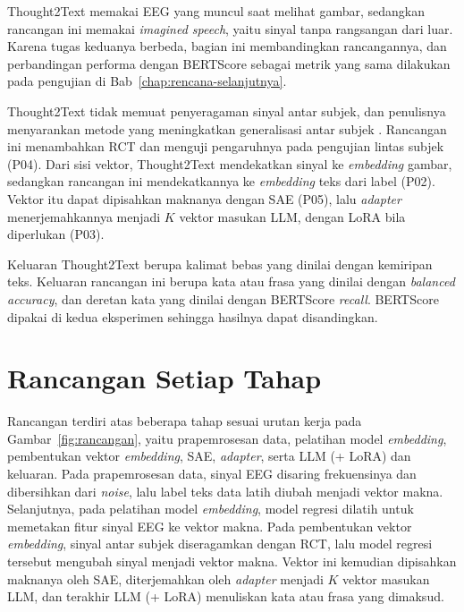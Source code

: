 Thought2Text memakai EEG yang muncul saat melihat gambar, sedangkan rancangan ini memakai \textit{imagined speech}, yaitu sinyal tanpa rangsangan dari luar.
Karena tugas keduanya berbeda, bagian ini membandingkan rancangannya, dan perbandingan performa dengan BERTScore sebagai metrik yang sama dilakukan pada pengujian di Bab~\ref{chap:rencana-selanjutnya}.

Thought2Text tidak memuat penyeragaman sinyal antar subjek, dan penulisnya menyarankan metode yang meningkatkan generalisasi antar subjek \parencite{mishra2025}.
Rancangan ini menambahkan RCT dan menguji pengaruhnya pada pengujian lintas subjek (P04).
Dari sisi vektor, Thought2Text mendekatkan sinyal ke \textit{embedding} gambar, sedangkan rancangan ini mendekatkannya ke \textit{embedding} teks dari label (P02).
Vektor itu dapat dipisahkan maknanya dengan SAE (P05), lalu \textit{adapter} menerjemahkannya menjadi $K$ vektor masukan LLM, dengan LoRA bila diperlukan (P03).

Keluaran Thought2Text berupa kalimat bebas yang dinilai dengan kemiripan teks.
Keluaran rancangan ini berupa kata atau frasa yang dinilai dengan \textit{balanced accuracy}, dan deretan kata yang dinilai dengan BERTScore \textit{recall}.
BERTScore dipakai di kedua eksperimen sehingga hasilnya dapat disandingkan.

\section{Rancangan Setiap Tahap}
\label{sec:rancangan-tahap}
Rancangan terdiri atas beberapa tahap sesuai urutan kerja pada Gambar~\ref{fig:rancangan}, yaitu prapemrosesan data, pelatihan model \textit{embedding}, pembentukan vektor \textit{embedding}, SAE, \textit{adapter}, serta LLM (+ LoRA) dan keluaran.
Pada prapemrosesan data, sinyal EEG disaring frekuensinya dan dibersihkan dari \textit{noise}, lalu label teks data latih diubah menjadi vektor makna.
Selanjutnya, pada pelatihan model \textit{embedding}, model regresi dilatih untuk memetakan fitur sinyal EEG ke vektor makna.
Pada pembentukan vektor \textit{embedding}, sinyal antar subjek diseragamkan dengan RCT, lalu model regresi tersebut mengubah sinyal menjadi vektor makna.
Vektor ini kemudian dipisahkan maknanya oleh SAE, diterjemahkan oleh \textit{adapter} menjadi $K$ vektor masukan LLM, dan terakhir LLM (+ LoRA) menuliskan kata atau frasa yang dimaksud.


